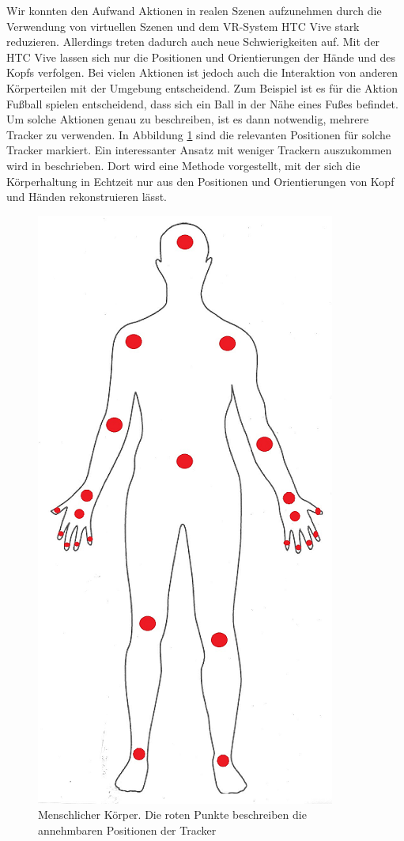 Wir konnten den Aufwand Aktionen in realen Szenen aufzunehmen durch die Verwendung von virtuellen Szenen und dem VR-System HTC Vive stark reduzieren. Allerdings treten dadurch auch neue Schwierigkeiten auf. Mit der HTC Vive lassen sich nur die Positionen und Orientierungen der Hände und des Kopfs verfolgen. Bei vielen Aktionen ist jedoch auch die Interaktion von anderen Körperteilen mit der Umgebung entscheidend. Zum Beispiel ist es für die Aktion \glqq{}Fußball spielen\grqq{} entscheidend, dass sich ein Ball in der Nähe eines Fußes befindet. Um solche Aktionen genau zu beschreiben, ist es dann notwendig, mehrere Tracker zu verwenden. In Abbildung \ref{fig:Human-Body} sind die relevanten Positionen für solche Tracker markiert. Ein interessanter Ansatz mit weniger Trackern auszukommen wird in \cite{body-reconstruction} beschrieben. Dort wird eine Methode vorgestellt, mit der sich die Körperhaltung in Echtzeit nur aus den Positionen und Orientierungen von Kopf und Händen rekonstruieren lässt.\newline
\begin{figure}[hbtp]
\centering
\includegraphics[width=0.2\linewidth]{human_body1.png}
\caption{Menschlicher Körper. Die roten Punkte beschreiben die annehmbaren Positionen der Tracker}
\label{fig:Human-Body}
\end{figure}

